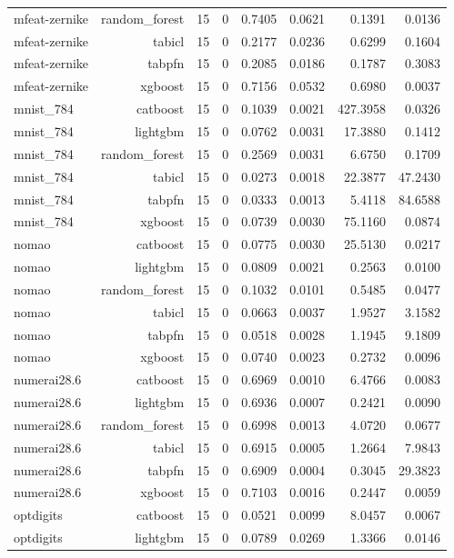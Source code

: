 \begin{table}[htbp]
\begin{tabular}{lrrrrrrr}
mfeat-zernike & random\_forest & 15 & 0 & 0.7405 & 0.0621 & 0.1391 & 0.0136 \\
mfeat-zernike & tabicl & 15 & 0 & 0.2177 & 0.0236 & 0.6299 & 0.1604 \\
mfeat-zernike & tabpfn & 15 & 0 & 0.2085 & 0.0186 & 0.1787 & 0.3083 \\
mfeat-zernike & xgboost & 15 & 0 & 0.7156 & 0.0532 & 0.6980 & 0.0037 \\
mnist\_784 & catboost & 15 & 0 & 0.1039 & 0.0021 & 427.3958 & 0.0326 \\
mnist\_784 & lightgbm & 15 & 0 & 0.0762 & 0.0031 & 17.3880 & 0.1412 \\
mnist\_784 & random\_forest & 15 & 0 & 0.2569 & 0.0031 & 6.6750 & 0.1709 \\
mnist\_784 & tabicl & 15 & 0 & 0.0273 & 0.0018 & 22.3877 & 47.2430 \\
mnist\_784 & tabpfn & 15 & 0 & 0.0333 & 0.0013 & 5.4118 & 84.6588 \\
mnist\_784 & xgboost & 15 & 0 & 0.0739 & 0.0030 & 75.1160 & 0.0874 \\
nomao & catboost & 15 & 0 & 0.0775 & 0.0030 & 25.5130 & 0.0217 \\
nomao & lightgbm & 15 & 0 & 0.0809 & 0.0021 & 0.2563 & 0.0100 \\
nomao & random\_forest & 15 & 0 & 0.1032 & 0.0101 & 0.5485 & 0.0477 \\
nomao & tabicl & 15 & 0 & 0.0663 & 0.0037 & 1.9527 & 3.1582 \\
nomao & tabpfn & 15 & 0 & 0.0518 & 0.0028 & 1.1945 & 9.1809 \\
nomao & xgboost & 15 & 0 & 0.0740 & 0.0023 & 0.2732 & 0.0096 \\
numerai28.6 & catboost & 15 & 0 & 0.6969 & 0.0010 & 6.4766 & 0.0083 \\
numerai28.6 & lightgbm & 15 & 0 & 0.6936 & 0.0007 & 0.2421 & 0.0090 \\
numerai28.6 & random\_forest & 15 & 0 & 0.6998 & 0.0013 & 4.0720 & 0.0677 \\
numerai28.6 & tabicl & 15 & 0 & 0.6915 & 0.0005 & 1.2664 & 7.9843 \\
numerai28.6 & tabpfn & 15 & 0 & 0.6909 & 0.0004 & 0.3045 & 29.3823 \\
numerai28.6 & xgboost & 15 & 0 & 0.7103 & 0.0016 & 0.2447 & 0.0059 \\
optdigits & catboost & 15 & 0 & 0.0521 & 0.0099 & 8.0457 & 0.0067 \\
optdigits & lightgbm & 15 & 0 & 0.0789 & 0.0269 & 1.3366 & 0.0146 \\

\end{tabular}
\end{table}
